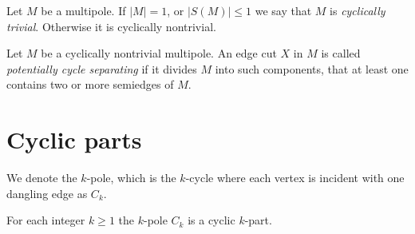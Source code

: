 \documentclass[12pt, twoside]{book}
\begin{document}
\begin{definition}
	Let $M$ be a multipole. If $|M|=1$, or $|S(M)|\leq 1$ we say that $M$ is \textit{cyclically trivial}. Otherwise it is cyclically nontrivial. 
\end{definition}

\begin{definition}
	Let $M$ be a cyclically nontrivial multipole. An edge cut $X$ in $M$ is called \textit{potentially cycle separating} if it divides $M$ into such components, that at least one contains two or more semiedges of $M$.
\end{definition}

\section{Cyclic parts}\label{sec:cyclic-part-results}

We denote the $k$-pole, which is the $k$-cycle where each vertex is incident with one dangling edge as $C_k$.

\begin{lemma}\label{lem:each-cycle-cyclic-part}
	For each integer $k\geq 1$ the $k$-pole $C_k$ is a cyclic $k$-part. 
\end{lemma}
\end{document}
